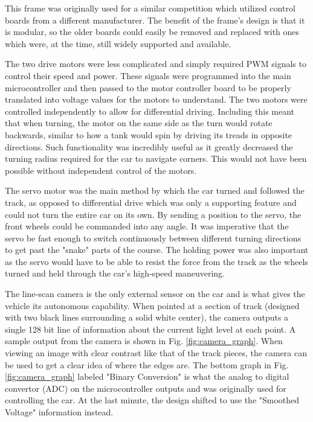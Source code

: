 \documentclass[conference]{IEEEtran}
\begin{document}
    This frame was originally used for a similar competition which utilized
    control boards from a different manufacturer. The benefit of the frame's
    design is that it is modular, so the older boards could easily be removed
    and replaced with ones which were, at the time, still widely supported and
    available.

    The two drive motors were less complicated and simply required PWM signals
    to control their speed and power. These signals were programmed into the
    main microcontroller and then passed to the motor controller board to be
    properly translated into voltage values for the motors to understand. The
    two motors were controlled independently to allow for differential
    driving. Including this meant that when turning, the motor on the same
    side as the turn would rotate backwards, similar to how a tank would spin
    by driving its treads in opposite directions. Such functionality was
    incredibly useful as it greatly decreased the turning radius required for
    the car to navigate corners. This would not have been possible without
    independent control of the motors.

    The servo motor was the main method by which the car turned and followed
    the track, as opposed to differential drive which was only a supporting
    feature and could not turn the entire car on its own. By sending a
    position to the servo, the front wheels could be commanded into any angle.
    It was imperative that the servo be fast enough to switch continuously
    between different turning directions to get past the "snake" parts of the
    course. The holding power was also important as the servo would have to be
    able to resist the force from the track as the wheels turned and held
    through the car's high-speed maneuvering.

    The line-scan camera is the only external sensor on the car and is what
    gives the vehicle its autonomous capability. When pointed at a section of
    track (designed with two black lines surrounding a solid white center),
    the camera outputs a single 128 bit line of information about the current
    light level at each point. A sample output from the camera is shown in
    Fig. \ref{fig:camera_graph}. When viewing an image with clear contrast
    like that of the track pieces, the camera can be used to get a clear idea
    of where the edges are. The bottom graph in Fig. \ref{fig:camera_graph}
    labeled "Binary Conversion" is what the analog to digital convertor (ADC)
    on the microcontroller outputs and was originally used for controlling the
    car. At the last minute, the design shifted to use the "Smoothed Voltage"
    information instead.
\end{document}

